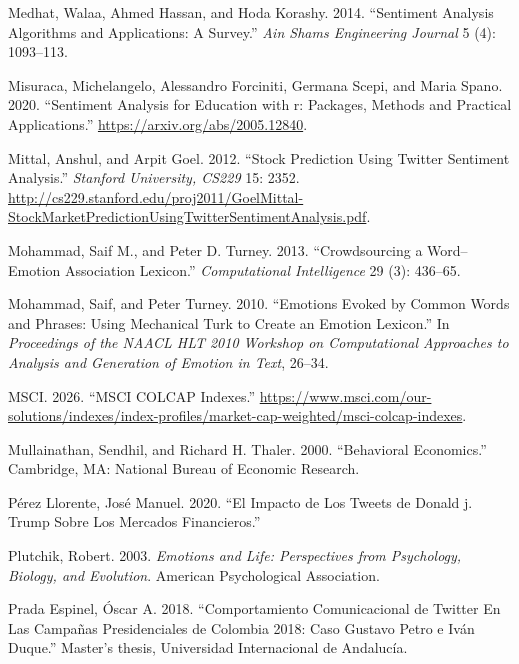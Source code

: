 \documentclass[
]{interact}
\newlength{\cslhangindent}
\newenvironment{CSLReferences}[2] %
 {\begin{list}{}{%
  \setlength{\itemindent}{0pt}
  \setlength{\leftmargin}{0pt}
  \setlength{\parsep}{0pt}
  \ifodd #1
   \setlength{\leftmargin}{\cslhangindent}
   \setlength{\itemindent}{-1\cslhangindent}
  \fi
  \setlength{\itemsep}{#2\baselineskip}}}
 {\end{list}}
\begin{document}
\begin{CSLReferences}{1}{0}
Medhat, Walaa, Ahmed Hassan, and Hoda Korashy. 2014. {``Sentiment
Analysis Algorithms and Applications: A Survey.''} \emph{Ain Shams
Engineering Journal} 5 (4): 1093--113.

Misuraca, Michelangelo, Alessandro Forciniti, Germana Scepi, and Maria
Spano. 2020. {``Sentiment Analysis for Education with r: Packages,
Methods and Practical Applications.''}
\url{https://arxiv.org/abs/2005.12840}.

Mittal, Anshul, and Arpit Goel. 2012. {``Stock Prediction Using Twitter
Sentiment Analysis.''} \emph{Stanford University, CS229} 15: 2352.
\url{http://cs229.stanford.edu/proj2011/GoelMittal-StockMarketPredictionUsingTwitterSentimentAnalysis.pdf}.

Mohammad, Saif M., and Peter D. Turney. 2013. {``Crowdsourcing a
Word--Emotion Association Lexicon.''} \emph{Computational Intelligence}
29 (3): 436--65.

Mohammad, Saif, and Peter Turney. 2010. {``Emotions Evoked by Common
Words and Phrases: Using Mechanical Turk to Create an Emotion
Lexicon.''} In \emph{Proceedings of the NAACL HLT 2010 Workshop on
Computational Approaches to Analysis and Generation of Emotion in Text},
26--34.

MSCI. 2026. {``{MSCI COLCAP} Indexes.''}
\url{https://www.msci.com/our-solutions/indexes/index-profiles/market-cap-weighted/msci-colcap-indexes}.

Mullainathan, Sendhil, and Richard H. Thaler. 2000. {``Behavioral
Economics.''} Cambridge, MA: National Bureau of Economic Research.

Pérez Llorente, José Manuel. 2020. {``El Impacto de Los Tweets de Donald
j. Trump Sobre Los Mercados Financieros.''}

Plutchik, Robert. 2003. \emph{Emotions and Life: Perspectives from
Psychology, Biology, and Evolution}. American Psychological Association.

Prada Espinel, Óscar A. 2018. {``Comportamiento Comunicacional de
Twitter En Las Campa{ñ}as Presidenciales de Colombia 2018: Caso Gustavo
Petro e Iv{á}n Duque.''} Master's thesis, Universidad Internacional de
Andaluc{í}a.


\end{CSLReferences}
\end{document}
